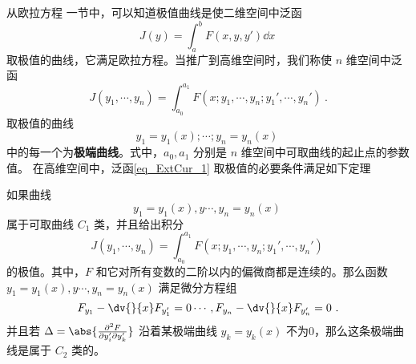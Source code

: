 

从欧拉方程 一节中，可以知道极值曲线是使二维空间中泛函 
\begin{equation}
J(y)=\int_a^b F(x,y,y')\dd x~
\end{equation}
取极值的曲线，它满足欧拉方程。当推广到高维空间时，我们称使 $n$ 维空间中泛函 
\begin{equation}\label{eq_ExtCur_1}
J(y_1,\cdots, y_n)=\int_{a_0}^{a_1}F(x;y_1,\cdots,y_n;y_1',\cdots,y_n') ~.
\end{equation}
取极值的曲线 
\begin{equation}
y_1=y_1(x);\cdots;y_n=y_n(x)~
\end{equation}
中的每一个为\textbf{极端曲线}。式中，$a_0,a_1$ 分别是 $n$ 维空间中可取曲线的起止点的参数值。 
在高维空间中，泛函\autoref{eq_ExtCur_1} 取极值的必要条件满足如下定理
\begin{theorem}{}
如果曲线 
\begin{equation}
y_1=y_1(x),y\cdots,y_n=y_n(x)~
\end{equation}
属于可取曲线 $C_1$ 类，并且给出积分 
\begin{equation}
J(y_1,\cdots, y_n)=\int_{a_0}^{a_1}F(x;y_1,\cdots,y_n;y_1',\cdots,y_n') ~
\end{equation}
 的极值。其中，$F$ 和它对所有变数的二阶以内的偏微商都是连续的。那么函数 $y_1=y_1(x),y\cdots,y_n=y_n(x)$ 满足微分方程组
\begin{equation}
F_{y_1}-\dv{}{x}F_{y_1'}=0\cdots, F_{y_n}-\dv{}{x}F_{y_n'}=0~.
\end{equation}
并且若 $\Delta=\abs{\frac{\partial^2 F}{\partial y_i'\partial y_k'}}$ 沿着某极端曲线 $y_k=y_k(x)$ 不为0，那么这条极端曲线是属于 $C_2$ 类的。
\end{theorem}
